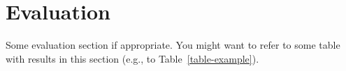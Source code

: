 \section{Evaluation} \label{evaluation}

Some evaluation section if appropriate. You might want to refer to some table with results in this section (e.g., to Table~\ref{table-example}).


